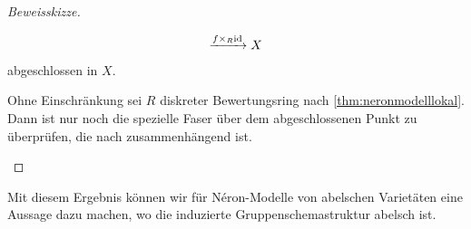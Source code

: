 \begin{Satz}
\begin{proof}[Beweisskizze]
\begin{description}[font=\normalfont\itshape]
\begin{gather*}
        \xrightarrow{f\times_R\mathrm{id}} X
      \end{gather*}
      abgeschlossen in $X$.
    \item[$A$ hat zusammenhängende Fasern:]
      Ohne Einschränkung sei $R$ diskreter Bewertungsring nach
      \ref{thm:neronmodelllokal}.
      Dann ist nur noch die spezielle Faser über dem abgeschlossenen
      Punkt zu überprüfen, die nach \cite[{}5.5.1]{EGAIII-1} zusammenhängend
      ist.
    \end{description}
  \end{proof}
\end{Satz}

Mit diesem Ergebnis können wir für Néron-Modelle von
abelschen Varietäten eine Aussage dazu machen, wo die induzierte
Gruppenschemastruktur abelsch ist.
